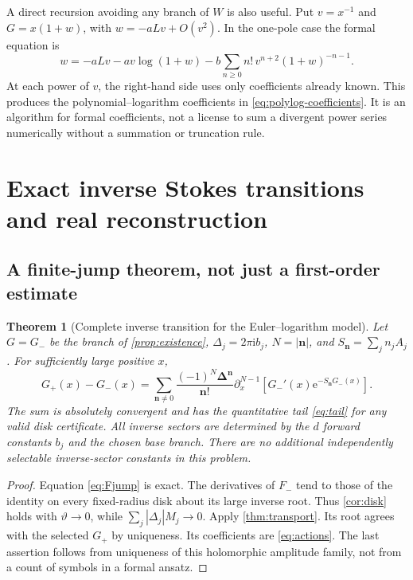 \documentclass[11pt,a4paper]{article}
\numberwithin{equation}{section}
\newtheorem{theorem}{Theorem}[section]
\theoremstyle{definition}
\theoremstyle{remark}
\newcommand{\e}{\mathrm e}
\newcommand{\ii}{\mathrm i}
\newcommand{\bn}{\boldsymbol n}
\begin{document}
A direct recursion avoiding any branch of $W$ is also useful. Put $v=x^{-1}$ and
$G=x(1+w)$, with $w=-aLv+O(v^2)$. In the one-pole case the formal equation is
\begin{equation}
 w=-aLv-av\log(1+w)
 -b\sum_{n\geq0}n!\,v^{n+2}(1+w)^{-n-1}.
 \label{eq:polylog-recursion}
\end{equation}
At each power of $v$, the right-hand side uses only coefficients already known. This produces the polynomial--logarithm coefficients in \eqref{eq:polylog-coefficients}. It is an algorithm for formal coefficients, not a license to sum a divergent power series numerically without a summation or truncation rule.

\section{Exact inverse Stokes transitions and real reconstruction}
\label{sec:jump}

\subsection{A finite-jump theorem, not just a first-order estimate}
\begin{theorem}[Complete inverse transition for the Euler--logarithm model]
\label{thm:jump}
Let $G=G_-$ be the branch of \cref{prop:existence}, $\Delta_j=2\pi\ii b_j$, $N=|\bn|$, and $S_{\bn}=\sum_jn_jA_j$. For sufficiently large positive $x$,
\begin{equation}
 G_+(x)-G_-(x)=
 \sum_{\bn\neq0}\frac{(-1)^N\boldsymbol\Delta^{\bn}}{\bn!}
 \partial_x^{N-1}\left[G_-'(x)\e^{-S_{\bn}G_-(x)}\right].
 \label{eq:exact-Stokes}
\end{equation}
The sum is absolutely convergent and has the quantitative tail \eqref{eq:tail} for any valid disk certificate. All inverse sectors are determined by the $d$ forward constants $b_j$ and the chosen base branch. There are no additional independently selectable inverse-sector constants in this problem.
\end{theorem}
\begin{proof}
Equation \eqref{eq:Fjump} is exact. The derivatives of $F_-$ tend to those of the identity on every fixed-radius disk about its large inverse root. Thus \cref{cor:disk} holds with $\vartheta\to0$, while
$\sum_j|\Delta_j|M_j\to0$. Apply \cref{thm:transport}. Its root agrees with the selected $G_+$ by uniqueness. Its coefficients are \eqref{eq:actions}. The last assertion follows from uniqueness of this holomorphic amplitude family, not from a count of symbols in a formal ansatz.
\end{proof}
\end{document}
